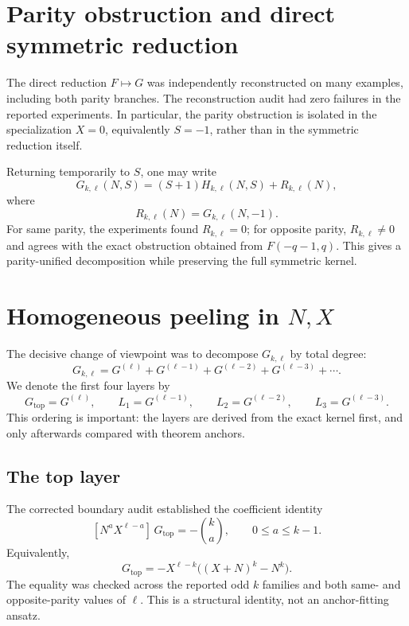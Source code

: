 \documentclass[11pt]{article}
\theoremstyle{remark}
\newcommand{\C}{\binom}
\newcommand{\Lone}{L_1}
\newcommand{\Ltwo}{L_2}
\newcommand{\Lthree}{L_3}
\begin{document}
\section{Parity obstruction and direct symmetric reduction}

The direct reduction \(F\mapsto G\) was independently reconstructed on many examples,
including both parity branches.  The reconstruction audit had zero failures in the
reported experiments.  In particular, the parity obstruction is isolated in the
specialization \(X=0\), equivalently \(S=-1\), rather than in the symmetric reduction
itself.

Returning temporarily to \(S\), one may write
\[
    G_{k,\ell}(N,S)
    =(S+1)H_{k,\ell}(N,S)+R_{k,\ell}(N),
\]
where
\[
    R_{k,\ell}(N)=G_{k,\ell}(N,-1).
\]
For same parity, the experiments found \(R_{k,\ell}=0\); for opposite parity,
\(R_{k,\ell}\neq0\) and agrees with the exact obstruction obtained from
\(F(-q-1,q)\).  This gives a parity-unified decomposition while preserving the full
symmetric kernel.

\section{Homogeneous peeling in \(N,X\)}

The decisive change of viewpoint was to decompose \(G_{k,\ell}\) by total degree:
\[
    G_{k,\ell}=G^{(\ell)}+G^{(\ell-1)}+G^{(\ell-2)}+G^{(\ell-3)}+\cdots .
\]
We denote the first four layers by
\[
    G_{\mathrm{top}}=G^{(\ell)},
    \qquad
    \Lone=G^{(\ell-1)},
    \qquad
    \Ltwo=G^{(\ell-2)},
    \qquad
    \Lthree=G^{(\ell-3)}.
\]
This ordering is important: the layers are derived from the exact kernel first, and
only afterwards compared with theorem anchors.

\subsection{The top layer}

The corrected boundary audit established the coefficient identity
\[
    [N^aX^{\ell-a}]\,G_{\mathrm{top}}
    =-\C{k}{a},
    \qquad 0\le a\le k-1.
\]
Equivalently,
\begin{equation}
\boxed{
    G_{\mathrm{top}}
    =-X^{\ell-k}\bigl((X+N)^k-N^k\bigr).
}
\label{eq:top}
\end{equation}
The equality was checked across the reported odd \(k\) families and both same- and
opposite-parity values of \(\ell\).  This is a structural identity, not an
anchor-fitting ansatz.
\end{document}
